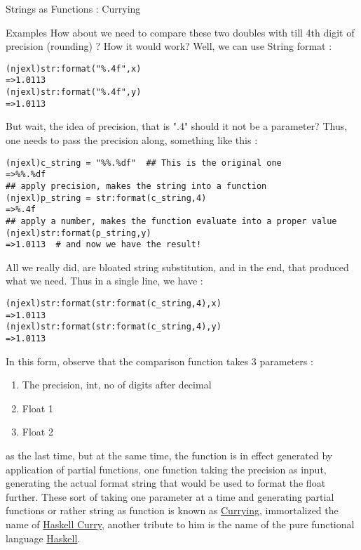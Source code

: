 \begin{section}{Strings as Functions : Currying}
\begin{subsection}{Examples}
How about we need to compare these two doubles with till 4th digit of precision (rounding) ? 
How it would work? Well, we can use String format :

\begin{lstlisting}[style=all]
(njexl)str:format("%.4f",x)
=>1.0113
(njexl)str:format("%.4f",y)
=>1.0113
\end{lstlisting}

But wait, the idea of precision, that is ".4" should it not be a parameter? 
Thus, one needs to pass the precision along, something like this :

\begin{lstlisting}[style=all]
(njexl)c_string = "%%.%df"  ## This is the original one 
=>%%.%df
## apply precision, makes the string into a function 
(njexl)p_string = str:format(c_string,4) 
=>%.4f
## apply a number, makes the function evaluate into a proper value
(njexl)str:format(p_string,y)  
=>1.0113  # and now we have the result!
\end{lstlisting}

All we really did, are bloated string substitution, and in the end, that produced what we need. 
Thus in a single line, we have :

\begin{lstlisting}[style=all]
(njexl)str:format(str:format(c_string,4),x)
=>1.0113
(njexl)str:format(str:format(c_string,4),y)
=>1.0113
\end{lstlisting}

In this form, observe that the comparison function takes 3 parameters :
\begin{enumerate}
\item{ The precision, int, no of digits after decimal }
\item{ Float 1 }
\item{ Float 2 }
\end{enumerate}

as the last time, but at the same time, the function is in effect generated by application of partial functions, one function taking the precision as input, generating the actual format string that would be used to format the float further. These sort of taking one parameter at a time and generating partial functions or rather string as function is known as \href{https://en.wikipedia.org/wiki/Currying}{Currying}, 
immortalized the name of \href{https://en.wikipedia.org/wiki/Haskell\_Curry}{Haskell Curry}, 
another tribute to him is the name of the pure functional language 
\href{https://en.wikipedia.org/wiki/Haskell\_(programming\_language)}{Haskell}.


\end{subsection}
\end{section}
